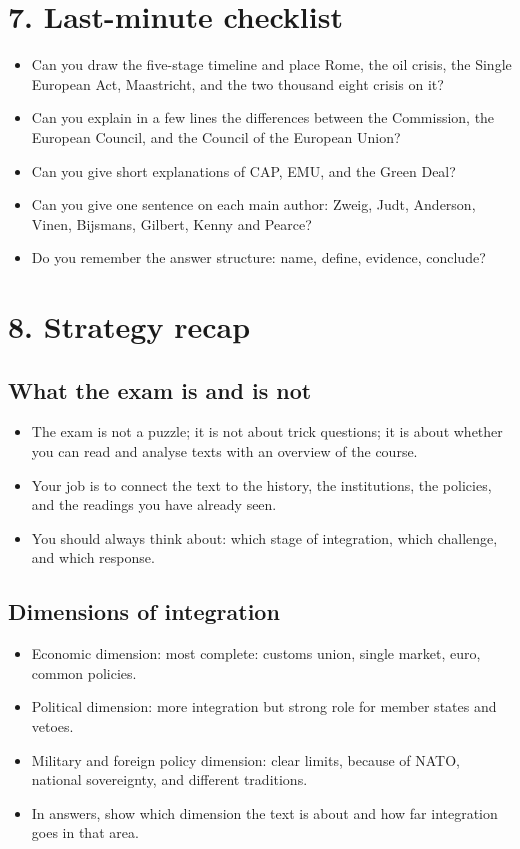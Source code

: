 \documentclass[10pt,a4paper]{article}
\begin{document}
\section*{7. Last-minute checklist}
\begin{itemize}
\item Can you draw the five-stage timeline and place Rome, the oil crisis, the Single European Act, Maastricht, and the two thousand eight crisis on it?
\item Can you explain in a few lines the differences between the Commission, the European Council, and the Council of the European Union?
\item Can you give short explanations of CAP, EMU, and the Green Deal?
\item Can you give one sentence on each main author: Zweig, Judt, Anderson, Vinen, Bijsmans, Gilbert, Kenny and Pearce?
\item Do you remember the answer structure: name, define, evidence, conclude?
\end{itemize}

\section*{8. Strategy recap}
\subsection*{What the exam is and is not}
\begin{itemize}
\item The exam is not a puzzle; it is not about trick questions; it is about whether you can read and analyse texts with an overview of the course.
\item Your job is to connect the text to the history, the institutions, the policies, and the readings you have already seen.
\item You should always think about: which stage of integration, which challenge, and which response.
\end{itemize}

\subsection*{Dimensions of integration}
\begin{itemize}
\item Economic dimension: most complete: customs union, single market, euro, common policies.
\item Political dimension: more integration but strong role for member states and vetoes.
\item Military and foreign policy dimension: clear limits, because of NATO, national sovereignty, and different traditions.
\item In answers, show which dimension the text is about and how far integration goes in that area.
\end{itemize}
\end{document}

